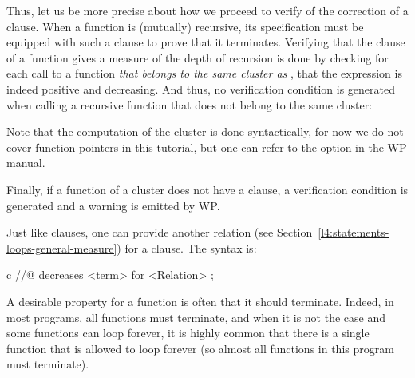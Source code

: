 Thus, let us be more precise about how we proceed to verify of the
correction of a  clause. When a function is (mutually)
recursive, its specification must be equipped with such a clause to prove that
it terminates. Verifying that the  clause of a function
 gives a measure of the depth of recursion is done by checking for
each call to a function \emph{that belongs to the same cluster as
}, that the expression is indeed positive and decreasing. And
thus, no verification condition is generated when calling a recursive function
that does not belong to the same cluster:




\begin{Information}
  Note that the computation of the cluster is done syntactically, for now we do
  not cover function pointers in this tutorial, but one can refer to the option
   in the WP manual.
\end{Information}


Finally, if a function of a cluster does not have a 
clause, a  verification condition is generated
and a warning is emitted by WP.






\begin{Information}
  Just like  clauses, one can provide another relation
  (see Section~\ref{l4:statements-loops-general-measure}) for a
   clause. The syntax is:


  \begin{CodeBlock}{c}
//@ decreases <term> for <Relation> ;
\end{CodeBlock}
\end{Information}




A desirable property for a function is often that it should terminate. Indeed,
in most programs, all functions must terminate, and when it is not the case and
some functions can loop forever, it is highly common that there is a single
function that is allowed to loop forever (so almost all functions in this
program must terminate).




